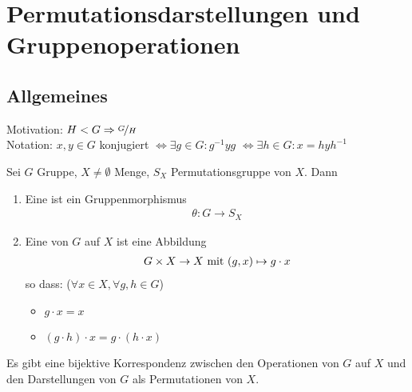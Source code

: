 \section{Permutationsdarstellungen und Gruppenoperationen}
\subsection*{Allgemeines}
Motivation: $H < G \implies \lnkset{G}{H}$\\
Notation: $x,y \in G$ konjugiert $\Leftrightarrow \exists g \in G \colon g^{-1}yg$ $\Leftrightarrow \exists h \in G\colon x = hyh^{-1}$
\begin{definition}
	Sei $G$ Gruppe, $X \neq \emptyset$ Menge, $S_X$ Permutationsgruppe von $X$. Dann
	\begin{enumerate}
		\item Eine  ist ein Gruppenmorphismus
		\begin{align*}
			\theta\colon G \to S_X
		\end{align*}
		\item Eine  von $G$ auf $X$ ist eine Abbildung
		\begin{align*}
			G\times X \to X \mit (g,x) \mapsto g\cdot x
		\end{align*}
		so dass: ($\forall x \in X, \forall g,h \in G$)
		\begin{itemize}
			\item $g \cdot x = x$
			\item $(g\cdot h)\cdot x = g \cdot (h\cdot x)$
		\end{itemize}
	\end{enumerate}
\end{definition}
\begin{proposition}
	Es gibt eine bijektive Korrespondenz zwischen den Operationen von $G$ auf $X$ und den Darstellungen von $G$ als Permutationen von $X$.
\end{proposition}
